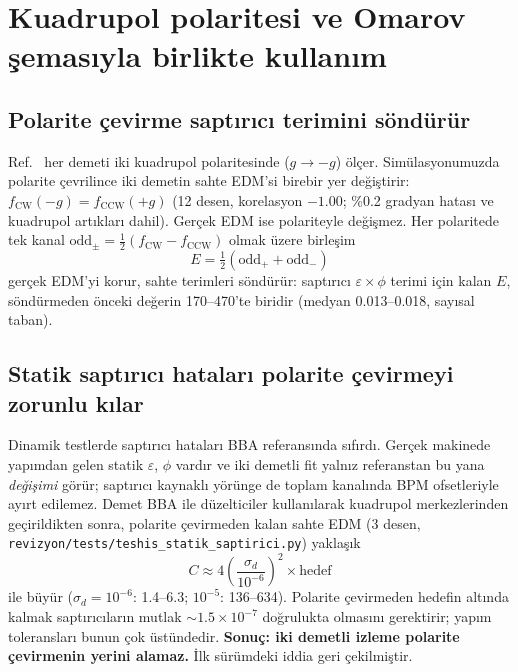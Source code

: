 \documentclass[11pt,a4paper]{article}
\begin{document}
\section{Kuadrupol polaritesi ve Omarov şemasıyla birlikte kullanım}\label{sec:polarite}
\subsection{Polarite çevirme saptırıcı terimini söndürür}
Ref.~\cite{omarov} her demeti iki kuadrupol polaritesinde ($g\to-g$) ölçer. Simülasyonumuzda polarite
çevrilince iki demetin sahte EDM'si birebir yer değiştirir: $f_\text{CW}(-g)=f_\text{CCW}(+g)$ (12 desen,
korelasyon $-1.00$; \%0.2 gradyan hatası ve kuadrupol artıkları dahil). Gerçek EDM ise polariteyle değişmez.
Her polaritede tek kanal $\text{odd}_\pm=\frac12(f_\text{CW}-f_\text{CCW})$ olmak üzere birleşim
\begin{equation}
E=\tfrac12(\text{odd}_++\text{odd}_-)
\end{equation}
gerçek EDM'yi korur, sahte terimleri söndürür: saptırıcı $\varepsilon\times\phi$ terimi için kalan $E$,
söndürmeden önceki değerin 170--470'te biridir (medyan 0.013--0.018, sayısal taban).

\subsection{Statik saptırıcı hataları polarite çevirmeyi zorunlu kılar}
Dinamik testlerde saptırıcı hataları BBA referansında sıfırdı. Gerçek makinede yapımdan gelen statik
$\varepsilon$, $\phi$ vardır ve iki demetli fit yalnız referanstan bu yana \emph{değişimi} görür; saptırıcı
kaynaklı yörünge de toplam kanalında BPM ofsetleriyle ayırt edilemez. Demet BBA ile düzelticiler kullanılarak
kuadrupol merkezlerinden geçirildikten sonra, polarite çevirmeden kalan sahte EDM (3 desen,
\texttt{revizyon/tests/teshis\_statik\_saptirici.py}) yaklaşık
\begin{equation}
C\approx4\left(\frac{\sigma_d}{10^{-6}}\right)^2\times\text{hedef}
\end{equation}
ile büyür ($\sigma_d=10^{-6}$: 1.4--6.3; $10^{-5}$: 136--634). Polarite çevirmeden hedefin altında kalmak
saptırıcıların mutlak $\sim1.5\times10^{-7}$ doğrulukta olmasını gerektirir; yapım toleransları bunun çok
üstündedir. \textbf{Sonuç: iki demetli izleme polarite çevirmenin yerini alamaz.} İlk sürümdeki iddia geri
çekilmiştir.
\end{document}
